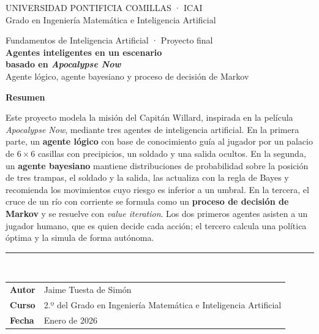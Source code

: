 \documentclass[11pt,a4paper]{article}
\begin{document}
\begin{titlepage}
\sffamily
{\color{gris}\small UNIVERSIDAD PONTIFICIA COMILLAS · ICAI\\[2pt]
Grado en Ingeniería Matemática e Inteligencia Artificial}

\vspace{2.6cm}
\begin{tcolorbox}[enhanced,frame hidden,colback=white,borderline west={5pt}{0pt}{verde},left=16pt,top=6pt,bottom=6pt]
{\color{gris}\large Fundamentos de Inteligencia Artificial · Proyecto final}\\[12pt]
{\fontsize{26}{32}\selectfont\bfseries\color{verde} Agentes inteligentes en un escenario\\[4pt] basado en \emph{Apocalypse Now}}\\[14pt]
{\Large Agente lógico, agente bayesiano y proceso de decisión de Markov}
\end{tcolorbox}

\vspace{1.4cm}
{\rmfamily\small
{\sffamily\bfseries\color{verde} Resumen}\par\smallskip
Este proyecto modela la misión del Capitán Willard, inspirada en la película \emph{Apocalypse Now}, mediante tres agentes de inteligencia artificial. En la primera parte, un \textbf{agente lógico} con base de conocimiento guía al jugador por un palacio de $6\times6$ casillas con precipicios, un soldado y una salida ocultos. En la segunda, un \textbf{agente bayesiano} mantiene distribuciones de probabilidad sobre la posición de tres trampas, el soldado y la salida, las actualiza con la regla de Bayes y recomienda los movimientos cuyo riesgo es inferior a un umbral. En la tercera, el cruce de un río con corriente se formula como un \textbf{proceso de decisión de Markov} y se resuelve con \emph{value iteration}. Los dos primeros agentes asisten a un jugador humano, que es quien decide cada acción; el tercero calcula una política óptima y la simula de forma autónoma.\par}

\vfill
{\color{lineagris}\rule{\linewidth}{0.8pt}}\\[8pt]
\begin{tabularx}{\linewidth}{@{}lX@{}}
\textbf{Autor} & Jaime Tuesta de Simón\\[3pt]
\textbf{Curso} & 2.º del Grado en Ingeniería Matemática e Inteligencia Artificial\\[3pt]
\textbf{Fecha} & Enero de 2026\\
\end{tabularx}
\end{titlepage}
\end{document}
